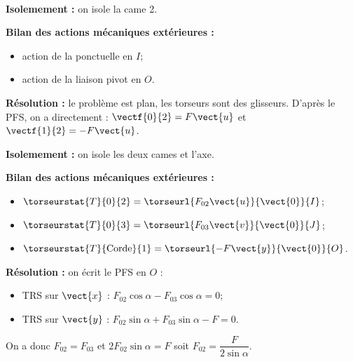 \ifprof
\begin{corrige}~\\

\textbf{Isolemement : } on isole la came 2.

\textbf{Bilan des actions mécaniques extérieures :}
\begin{itemize}
\item action de la ponctuelle en $I$;
\item action de la liaison pivot en $O$. 
\end{itemize}

\textbf{Résolution : } le problème est plan, les torseurs sont des glisseurs. D'après le PFS, on a directement : 
$\vectf{0}{2} = F \vect{u}$
et $\vectf{1}{2} =- F \vect{u}$.
\vspace{1cm}

\textbf{Isolemement : } on isole les deux cames et l'axe. 

\textbf{Bilan des actions mécaniques extérieures :}
\begin{itemize}
\item $\torseurstat{T}{0}{2} = \torseurl{F_{02} \vect{u}}{\vect{0}}{I}$;
\item $\torseurstat{T}{0}{3} = \torseurl{F_{03} \vect{v}}{\vect{0}}{J}$;
\item $\torseurstat{T}{\text{Corde}}{1} = \torseurl{-F\vect{y} }{\vect{0}}{O}$.
\end{itemize}


\textbf{Résolution : } on écrit le PFS en $O$ :
\begin{itemize}
\item TRS sur $\vect{x}$ : $F_{02} \cos \alpha  - F_{03} \cos \alpha = 0 $;
\item TRS sur $\vect{y}$ : $F_{02} \sin \alpha  + F_{03} \sin \alpha  - F = 0$.
\end{itemize}

On a donc $F_{02}= F_{03}$ et $2 F_{02} \sin \alpha = F$ soit $F_{02} = \dfrac{F}{2 \sin \alpha}$.


\end{corrige}
\else
\fi


\ifprof
\begin{corrige}~\\
\end{corrige}
\else
\fi

